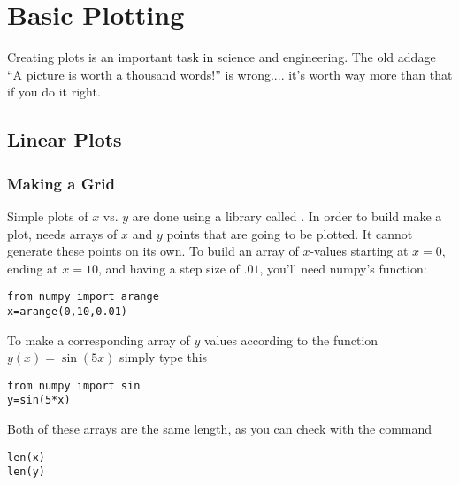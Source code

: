 \chapter{Basic Plotting}
\label{chap:1DPlots}

Creating plots is an important task in science and engineering.  The
old addage ``A picture is worth a thousand words!'' is wrong.... it's
worth way more than that if you do it right.
\medskip

\section{Linear Plots}

\subsection*{Making a Grid}
 Simple plots of $x$ vs. $y$ are done using a
library called .  In order to build make a plot,  needs arrays of $x$ and $y$ points that are going to be plotted.  It cannot generate these points on its own.
To build an array  of $x$-values
starting at $x=0$, ending at $x=10$, and having a step size of
$.01$, you'll need numpy's  function:
\begin{Verbatim}
from numpy import arange
x=arange(0,10,0.01)
\end{Verbatim}
To make a corresponding array of $y$ values according to the
function $y(x)=\sin(5x)$ simply type this
\begin{Verbatim}
from numpy import sin
y=sin(5*x)
\end{Verbatim}
Both of these arrays are the same length, as you can check with the
 command
\begin{Verbatim}
len(x)
len(y)
\end{Verbatim}

